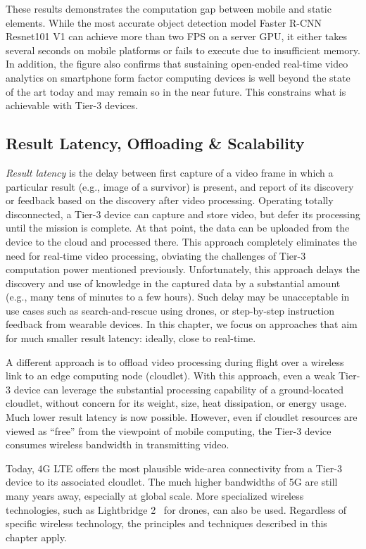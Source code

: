 These results demonstrates the computation gap between mobile and static
elements. While the most accurate object detection model Faster R-CNN Resnet101 V1
can achieve more than two FPS on a server GPU, it either takes several seconds
on  mobile platforms or fails to execute due to insufficient memory. In
addition, the figure also confirms that sustaining open-ended real-time video
analytics on smartphone form factor computing devices is well beyond the state
of the art today and may remain so in the near future.  This constrains what is
achievable with Tier-3 devices.

\subsection{\large Result Latency, Offloading \& Scalability}
\label{bw:offloading}

{\em Result latency} is the delay between first capture of a video frame in
which a particular result (e.g., image of a survivor) is present, and report of
its discovery or feedback based on the discovery after video processing.
Operating totally disconnected, a Tier-3 device can capture and store video, but
defer its processing until the mission is complete.  At that point, the data can
be uploaded from the device to the cloud and processed there.  This approach
completely eliminates the need for real-time video processing, obviating the
challenges of Tier-3 computation power mentioned previously. Unfortunately, this
approach delays the discovery and use of knowledge in the captured data by a
substantial amount (e.g., many tens of minutes to a few hours).  Such delay may
be unacceptable in use cases such as search-and-rescue using drones, or
step-by-step instruction feedback from wearable devices. In this chapter, we focus
on approaches that aim for much smaller result latency: ideally, close to
real-time.

A different approach is to offload video processing during flight over a
wireless link to an edge computing node (cloudlet). With this approach, even a
weak Tier-3 device can leverage the substantial processing capability of a
ground-located cloudlet, without concern for its weight, size, heat dissipation,
or energy usage.  Much lower result latency is now possible.  However, even if
cloudlet resources are viewed as ``free'' from the viewpoint of mobile
computing, the Tier-3 device consumes wireless bandwidth in transmitting video.

Today, 4G LTE offers the most plausible wide-area connectivity from a Tier-3
device to its associated cloudlet.  The much higher bandwidths of 5G are still
many years away, especially at global scale.  More specialized wireless
technologies, such as Lightbridge 2~\cite{LightBridge2} for drones, can also be
used.  Regardless of specific wireless technology, the principles and techniques
described in this chapter apply.

